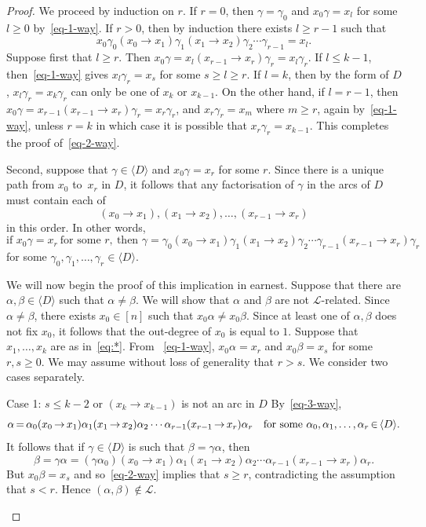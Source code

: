 \documentclass[ALCO,ThmDefs,Unicode,epreuves]{cedram}
\newcommand{\genset}[1]{\langle#1\rangle}
\newcommand{\LL}{\mathcal{L}}
\newcommand{\easty}[2]{(#1 \to #2)}
\newcommand{\nset}{[n]}
\newcommand*{\Mk}{\mkern -2mu}
\begin{document}
\begin{proof}
 We proceed by induction on $r$. If $r = 0$, then $\gamma = \gamma_0$ and
 $x_0\gamma = x_l$ for some $l\geq 0$ by~\eqref{eq-1-way}. If $r > 0$, then
 by induction there exists $l\geq r - 1$ such that
 \[x_0\gamma_0\easty{x_0}{x_1}\gamma_1\easty{x_1}{x_2}\gamma_2\cdots
 \gamma_{r-1} = x_l.\] 
 Suppose first that $l \geq r$. Then $x_0\gamma = x_l\easty{x_{r-1}}{x_r}\gamma_r= x_l\gamma_r$. If $l\leq k-1$, then~\eqref{eq-1-way} gives $x_l\gamma_r=x_s$ for some $s\geq l\geq r$. If $l=k$, then by the form of $D$, $x_l\gamma_r=x_k\gamma_r$ can only be one of $x_k$ or $x_{k-1}$.
 On the other hand, if $l = r -1$, then 
 $x_0\gamma = x_{r-1}\easty{x_{r-1}}{x_r}\gamma_r= x_r\gamma_r$,
 and $x_r\gamma_r = x_m$ where $m\geq r$, again by~\eqref{eq-1-way}, unless $r=k$ in which case it is possible that $x_r\gamma_r=x_{k-1}$. This completes the proof of~\eqref{eq-2-way}.

 Second, suppose that $\gamma\in \genset{D}$ and $x_0\gamma = x_r$ for some
 $r$. Since there is a unique path from $x_0$ to~$x_r$ in $D$, it follows that
 any factorisation of $\gamma$ in the arcs of $D$ must contain each of 
 \[(x_0\to x_1), (x_1\to x_2), \ldots, (x_{r -1}\to x_r)\]
 in this order. In other words,
 \begin{equation}\label{eq-3-way}
 \text{if } x_0\gamma = x_r\ \text{for some }r,\ \text{then }
 \gamma = \gamma_0\easty{x_0}{x_1}\gamma_1\easty{x_1}{x_2}\gamma_2\cdots
 \gamma_{r-1}\easty{x_{r-1}}{x_r}\gamma_r
 \end{equation}
 for some $\gamma_0,\gamma_1,\ldots,\gamma_r\in\genset{D}$. 

 We will now begin the proof of this implication in earnest. Suppose that
 there are $\alpha,\beta\in\genset{D}$ such that $\alpha\not=\beta$. We will
 show that $\alpha$ and $\beta$ are not $\LL$-related. Since $\alpha\not =
 \beta$, there exists $x_0\in \nset$ such that
 $x_0\alpha\not=x_0\beta$. Since at least one of $\alpha,\beta$ does not fix
 $x_0$, it follows that the out-degree of $x_0$ is equal
 to $1$. Suppose that $x_1,\ldots,x_k$ are as in~\eqref{eq:*}. From
~\eqref{eq-1-way}, $x_0\alpha=x_r$ and $x_0\beta=x_s$ for some $r,s\geq0$. We
 may assume without loss of generality that $r > s$. We consider two cases
 separately.

\begin{enonce*}[remark]{Case 1: ${s\leq k - 2}$ or ${(x_{k} \to
 x_{k-1})}$ is not an arc in ${D}$}
 By~\eqref{eq-3-way}, 
 \[\alpha\Mk =\Mk \alpha_0\easty{x_0\Mk }{\Mk x_1}\alpha_1\easty{x_1\Mk }{\Mk x_2}\alpha_2\cdots
 \alpha_{r-1}\easty{x_{r-1}\Mk }{\Mk x_r}\alpha_r \quad\text{for some }
 \alpha_0,\alpha_1,\ldots,\alpha_r\Mk \in\Mk \genset{D}.\]
 It follows that if $\gamma\in \genset{D}$ is such that $\beta=\gamma\alpha$,
 then 
 \[\beta = \gamma\alpha =
 (\gamma\alpha_0)\easty{x_0}{x_1}\alpha_1\easty{x_1}{x_2}\alpha_2\cdots
 \alpha_{r-1}\easty{x_{r-1}}{x_r}\alpha_r.\]
 But $x_0\beta = x_s$ and so~\eqref{eq-2-way} implies that $s \geq r$, 
 contradicting the assumption that $s<r$. Hence $(\alpha, \beta)\not \in \LL$. 
 \end{enonce*}


\end{proof}
\end{document}
